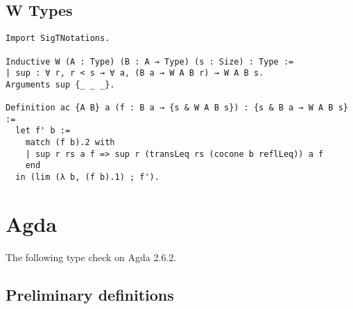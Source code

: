 \subsection{W Types} \label{app:mechanization:coq:W}

\begin{singlespace}
\begin{verbatim}
Import SigTNotations.

Inductive W (A : Type) (B : A → Type) (s : Size) : Type :=
| sup : ∀ r, r < s → ∀ a, (B a → W A B r) → W A B s.
Arguments sup {_ _ _}.

Definition ac {A B} a (f : B a → {s & W A B s}) : {s & B a → W A B s} :=
  let f' b :=
    match (f b).2 with
    | sup r rs a f => sup r (transLeq rs (cocone b reflLeq)) a f
    end
  in (lim (λ b, (f b).1) ; f').
\end{verbatim}
\end{singlespace}

\section{Agda}

The following type check on Agda 2.6.2.

\subsection{Preliminary definitions} \label{app:mechanization:agda:prelim}

